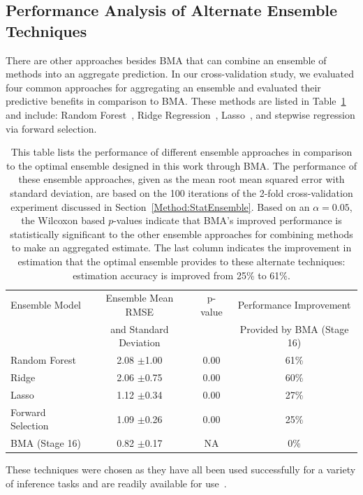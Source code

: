\documentclass[journal=jpcbfk, manuscript=article]{achemso}
\newcommand{\+}[1]{\ensuremath{\mathbf{#1}}}
\begin{document}
\subsection{Performance Analysis of Alternate Ensemble Techniques}
\label{Results:BMA_Variants}
There are other approaches besides BMA that can combine an ensemble of methods into an aggregate prediction.
In our cross-validation study, we evaluated four common approaches for aggregating an ensemble and evaluated their predictive benefits in comparison to BMA.
These methods are listed in Table~\ref{Analysis:Table4:EnsembleCompare} and include: Random Forest~\cite{Breiman:2001}, Ridge Regression~\cite{Hoerl:2000}, Lasso~\cite{Tibshirani:1994}, and stepwise regression via forward selection.
\begin{table}[h!]
	\centering
	\caption[Model comparison with mean RMSE]{This table lists the performance of different ensemble approaches in comparison to the optimal ensemble designed in this work through BMA.
	The performance of these ensemble approaches, given as the mean root mean squared error with standard deviation, are based on the 100 iterations of the 2-fold cross-validation experiment discussed in Section~\ref{Method:StatEnsemble}.
	Based on an $\alpha = 0.05$, the Wilcoxon based $p$-values indicate that BMA's improved performance is statistically significant to the other ensemble approaches for combining methods to make an aggregated estimate.
	The last column indicates the improvement in estimation that the optimal ensemble provides to these alternate techniques: estimation accuracy is improved from 25\% to 61\%. }
	\footnotesize
	\begin{tabular}{lccc}
		\hline
		\hline
		Ensemble Model  & Ensemble Mean RMSE  & p-value & Performance Improvement\\
		 & and Standard Deviation & & Provided by BMA (Stage 16)\\
		\hline
		Random Forest & 2.08 $\pm$1.00 & 0.00 & 61\%\\
		Ridge & 2.06 $\pm$0.75 & 0.00 & 60\%\\
		Lasso & 1.12 $\pm$0.34 & 0.00 & 27\%\\
		Forward Selection & 1.09 $\pm$0.26 & 0.00 &  25\%\\		
		BMA (Stage 16) & 0.82 $\pm$0.17 & NA & 0\%\\
		\hline
		\hline
	\end{tabular}
	\label{Analysis:Table4:EnsembleCompare}
\end{table}
These techniques were chosen as they have all been used successfully for a variety of inference tasks and are readily available for use~\cite{R:2008,sklearn_api:2013}.
\end{document}
